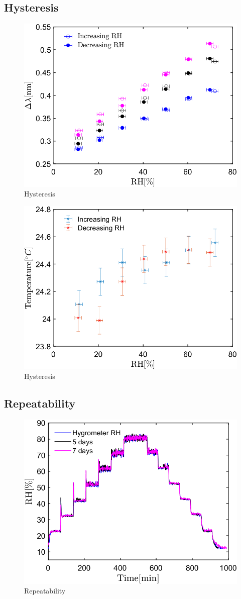\subsection{Hysteresis}

\begin{figure}[!h]
\centering
\includegraphics[width=0.6\columnwidth]{Chapter5/images/25_RHS.png}
\caption{Hysteresis}
\label{fig_hysteresis}
\end{figure}

\begin{figure}[!h]
\centering
\includegraphics[width=0.6\columnwidth]{Chapter5/images/25_RHST.png}
\caption{Hysteresis}
\label{fig_hysteresis2}
\end{figure}



\subsection{Repeatability}


\begin{figure}[!h]
\centering
\includegraphics[width=0.6\columnwidth]{Chapter5/images/repeat.png}
\caption{Repeatability}
\label{fig_repeatability}
\end{figure}



